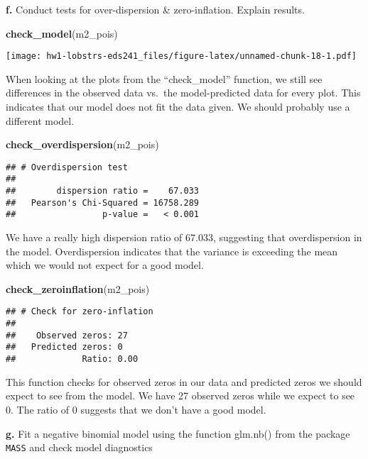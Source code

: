 \documentclass[
]{article}
\newenvironment{Shaded}{\begin{snugshade}}{\end{snugshade}}
\newcommand{\FunctionTok}[1]{\textcolor[rgb]{0.13,0.29,0.53}{\textbf{#1}}}
\newcommand{\NormalTok}[1]{#1}
\begin{document}
\textbf{f.} Conduct tests for over-dispersion \& zero-inflation. Explain
results.

\begin{Shaded}
\begin{Highlighting}[]
\FunctionTok{check\_model}\NormalTok{(m2\_pois)}
\end{Highlighting}
\end{Shaded}

\texttt{[image: hw1-lobstrs-eds241\_files/figure-latex/unnamed-chunk-18-1.pdf]}

When looking at the plots from the ``check\_model'' function, we still
see differences in the observed data vs.~the model-predicted data for
every plot. This indicates that our model does not fit the data given.
We should probably use a different model.

\begin{Shaded}
\begin{Highlighting}[]
\FunctionTok{check\_overdispersion}\NormalTok{(m2\_pois)}
\end{Highlighting}
\end{Shaded}

\begin{verbatim}
## # Overdispersion test
## 
##        dispersion ratio =    67.033
##   Pearson's Chi-Squared = 16758.289
##                 p-value =   < 0.001
\end{verbatim}

We have a really high dispersion ratio of 67.033, suggesting that
overdispersion in the model. Overdispersion indicates that the variance
is exceeding the mean which we would not expect for a good model.

\begin{Shaded}
\begin{Highlighting}[]
\FunctionTok{check\_zeroinflation}\NormalTok{(m2\_pois)}
\end{Highlighting}
\end{Shaded}

\begin{verbatim}
## # Check for zero-inflation
## 
##    Observed zeros: 27
##   Predicted zeros: 0
##             Ratio: 0.00
\end{verbatim}

This function checks for observed zeros in our data and predicted zeros
we should expect to see from the model. We have 27 observed zeros while
we expect to see 0. The ratio of 0 suggests that we don't have a good
model.

\textbf{g.} Fit a negative binomial model using the function glm.nb()
from the package \texttt{MASS} and check model diagnostics
\end{document}
